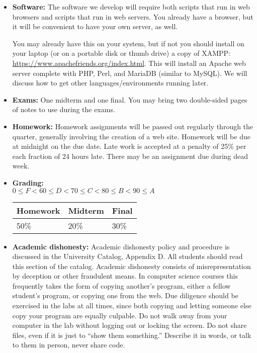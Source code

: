 \documentclass{article}
\begin{document}
\begin{itemize}
\item {\bf Software:}
  The software we develop will require both scripts that run in
  web browsers and scripts that run in web
  servers.  You already have a browser, but it will be convenient to
  have your own server, as well.

  You may already have this on your system, but if not
you should install on your laptop (or on a portable disk or thumb drive)
a copy of XAMPP: \url{https://www.apachefriends.org/index.html}.  This
will install an Apache web server complete with PHP, Perl, and MariaDB
(similar to MySQL).  We will discuss how to get other
languages/environments running later.

\item {\bf Exams:}   One
  midterm and one final.  You may bring two double-sided pages of notes to use
  during the exams.


\item {\bf Homework:}  Homework assignments will be passed out
  regularly through the quarter, generally involving the creation of a
  web site.   Homework will be due at midnight
  on the due date.  Late work is accepted at a penalty
  of 25\% per each fraction of 24 hours late.  There may be an assignment
  due during dead week.


\item {\bf Grading:} \\
$0\leq F < 60 \leq D < 70 \leq C < 80 \leq B < 90 \leq A$\hfill
\begin{tabular}{|l|l|l|}\hline
Homework  & Midterm & Final\\\hline
50\% & 20\% & 30\%\\\hline
\end{tabular}

\item {\bf Academic dishonesty:} Academic dishonesty policy and
  procedure is discussed in the University Catalog, Appendix D.  All
  students should read this section of the catalog.  Academic
  dishonesty consists of misrepresentation by deception or other
  fraudulent means.  In computer science courses this frequently takes
  the form of copying another's program, either a fellow student's
  program, or copying one from the web.  Due diligence should be
  exercised in the labs at all times, since both copying and letting
  someone else copy your program are equally culpable.  Do not walk
  away from your computer in the lab without logging out or locking
  the screen.  Do not share files, even if it is just to ``show them
  something.''  Describe it in words, or talk to them in person, never
  share code.


\end{itemize}
\end{document}
